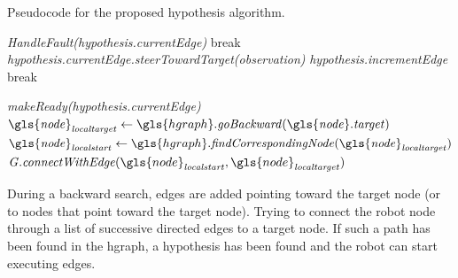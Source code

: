 \begin{algorithm}[H]
  \caption{Pseudocode for the proposed hypothesis algorithm.}\label{pseudocode:halgorithm}
  \begin{algorithmic}[1]

    \hspace{-0.9cm}\colorbox{my_grey}{\parbox{\linewidth}{%

        \hspace{-0.1cm}\colorbox{my_yellow}{\parbox{\linewidth}{%

            \hspace{-0.1cm}\colorbox{my_light_blue}{\parbox{\linewidth}{%
                 
                \State \textit{HandleFault(\gls{hypothesis}.currentEdge)}
                \State break
                \EndIf
                \State \textit{\gls{hypothesis}.currentEdge.steerTowardTarget(\gls{observation})}
                  \State \textit{\gls{hypothesis}.incrementEdge}
                \Else
                  \State break
                \EndIf
                \EndIf
                \EndWhile
            }}
            \Else
            \State \textit{makeReady(\gls{hypothesis}.currentEdge)}
            \EndIf
            \Else
            \State $\mathit{\gls{node}_{localtarget}} \leftarrow \gls{hgraph}.\mathit{goBackward(\gls{node}.target)}$
            \State $\mathit{\gls{node}_{localstart}} \leftarrow \gls{hgraph}.\mathit{findCorrespondingNode(\gls{node}_{localtarget})}$ 
            \State $\mathit{G.connectWithEdge}(\gls{node}_\mathit{localstart}, \gls{node}_\mathit{localtarget})$
            \EndIf
            \EndWhile
        }}
        \EndFor
    }}
  \end{algorithmic}
\end{algorithm}

During a backward search, edges are added pointing toward the target node (or to nodes that point toward the target node). Trying to connect the robot node through a list of successive directed edges to a target node. If such a path has been found in the \ac{hgraph}, a hypothesis has been found and the robot can start executing edges.\bs

